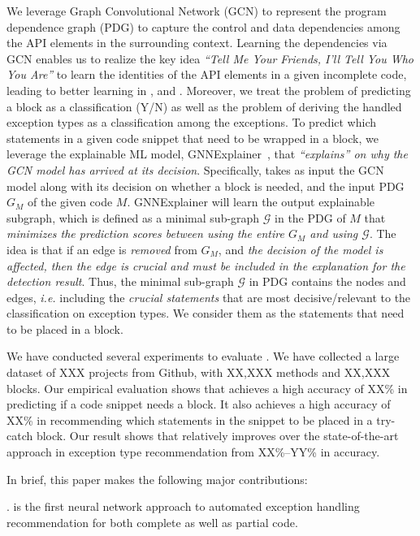 We leverage Graph Convolutional Network (GCN) to represent the program
dependence graph (PDG) to capture the control and data dependencies
among the API elements in the surrounding context. Learning the
dependencies via GCN enables us to realize the key idea {\em ``Tell Me
  Your Friends, I'll Tell You Who You Are''} to learn the identities
of the API elements in a given incomplete code, leading to better
learning in {\xblock}, {\xstate} and {\xtype}. Moreover, we treat the
problem of predicting a  block as a classification
(Y/N) as well as the problem of deriving the handled exception types
as a classification among the exceptions.
%
To predict which statements in a given code snippet that need to be
wrapped in a  block, we leverage the explainable ML
model, GNNExplainer~\cite{GNNExplainer}, that {\em ``explains'' on why
  the GCN model has arrived at its decision}. Specifically, {\tool}
takes as input the GCN model along with its decision on whether a
 block is needed, and the input PDG $G_M$ of the given
code $M$. GNNExplainer will learn the output explainable subgraph,
which is defined as a minimal sub-graph $\mathcal{G}$ in the PDG of
$M$ that {\em minimizes the prediction scores between using the entire
  $G_M$ and using $\mathcal{G}$}. The idea is that if an edge is {\em
  removed} from $G_M$, and {\em the decision of the model is affected,
  then the edge is crucial and must be included in the explanation for
  the detection result}. Thus, the minimal sub-graph $\mathcal{G}$ in
PDG contains the nodes and edges, {\em i.e.}  including the {\em
  crucial statements} that are most decisive/relevant to the
classification on exception types. We consider them as the statements
that need to be placed in a  block.

We have conducted several experiments to evaluate {\tool}. We have
collected a large dataset of XXX projects from Github, with XX,XXX
methods and XX,XXX  blocks. Our empirical evaluation
shows that {\tool} achieves a high accuracy of XX\% in predicting if a
code snippet needs a  block. It also achieves a high
accuracy of XX\% in recommending which statements in the snippet to be
placed in a try-catch block. Our result shows that {\xtype} relatively
improves over the state-of-the-art approach in exception type
recommendation from XX\%–YY\% in accuracy.

In brief, this paper makes the following major contributions:

. {\tool} is the first neural network approach to
  automated exception handling recommendation for both complete as
  well as partial code.

